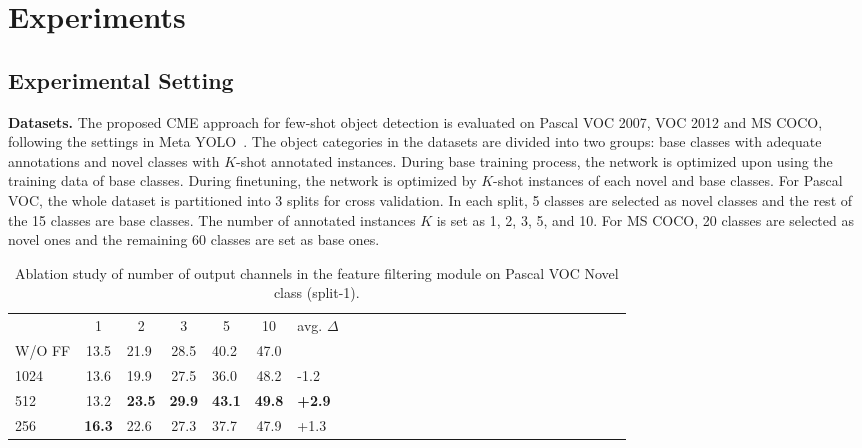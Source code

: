 \documentclass[final]{cvpr}
\begin{document}
\section{Experiments}

\subsection{Experimental Setting}
\textbf{Datasets.}
The proposed CME approach for few-shot object detection is evaluated on Pascal VOC 2007, VOC 2012 and MS COCO,  following the settings in Meta YOLO~\cite{FeatureReweighting}. The object categories in the datasets are divided into two groups: base classes with adequate annotations and novel classes with $K$-shot annotated instances. During base training process, the network is optimized upon using the training data of base classes. During finetuning, the network is optimized by $K$-shot instances of each novel and base classes. For Pascal VOC, the whole dataset is partitioned into 3 splits for cross validation. In each split, 5 classes are selected as novel classes and the rest of the 15 classes are base classes. The number of annotated instances $K$ is set as 1, 2, 3, 5, and 10. For MS COCO, 20 classes are selected as novel ones and the remaining 60 classes are set as base ones. 


\setlength{\tabcolsep}{4pt}
    \begin{table}[t]
    \begin{center}
    \caption{Ablation study of number of output channels in the feature filtering module on Pascal VOC Novel class (split-1).}
    \label{table:Ab_channel_number}
    \begin{tabular}{l|clclclclclclclclclclclclcl}
    \hline\noalign{\smallskip}
    \multicolumn{1}{c}{{\diagbox{Num.}{Shots}}} & \multicolumn{1}{c}{{1}} & \multicolumn{1}{c}{{2}} & \multicolumn{1}{c}{{3}} & \multicolumn{1}{c}{{5}} & \multicolumn{1}{c}{{10}} & \multicolumn{1}{c}{{avg. $\Delta$}}\\
    \noalign{\smallskip}
    \hline
    \noalign{\smallskip}
    {W/O FF}  & {13.5} & {21.9} & {28.5} & {40.2} & {47.0} & {}\\ 
    {1024}  & {13.6} & {19.9} & {27.5} & {36.0} & {48.2} & {-1.2}\\ 
    {512} & {13.2} & \bf{23.5} & \bf{29.9} & \bf{43.1} & \bf{49.8} & \bf{+2.9}\\ 
    {256} & \bf{16.3} & {22.6} & {27.3} & {37.7} & {47.9} & {+1.3}\\ 
    \hline
    \end{tabular}
    \end{center}
    \end{table}
    \setlength{\tabcolsep}{1.4pt}
\end{document}
